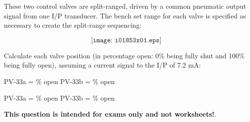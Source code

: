 

These two control valves are split-ranged, driven by a common pneumatic output signal from one I/P transducer.  The bench set range for each valve is specified as necessary to create the split-range sequencing:

$$\texttt{[image: i01853x01.eps]}$$

Calculate each valve position (in percentage open: 0\% being fully shut and 100\% being fully open), assuming a current signal to the I/P of 7.2 mA:

\vskip 20pt

\hskip 50pt PV-33a = \underbar{\hskip 50pt} \% open \hskip 60pt PV-33b = \underbar{\hskip 50pt} \% open







PV-33a =  \% open \hskip 100pt PV-33b =  \% open







{\bf This question is intended for exams only and not worksheets!}.


